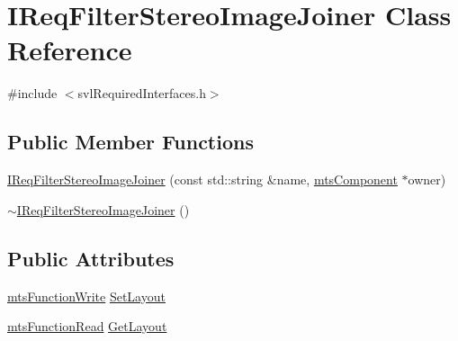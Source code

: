 \hypertarget{class_i_req_filter_stereo_image_joiner}{\section{I\-Req\-Filter\-Stereo\-Image\-Joiner Class Reference}
\label{class_i_req_filter_stereo_image_joiner}
}


{\ttfamily \#include $<$svl\-Required\-Interfaces.\-h$>$}

\subsection*{Public Member Functions}
\begin{DoxyCompactItemize}
\item 
\hyperlink{class_i_req_filter_stereo_image_joiner_a38b9f6681dd0448013184e714d353925}{I\-Req\-Filter\-Stereo\-Image\-Joiner} (const std\-::string \&name, \hyperlink{classmts_component}{mts\-Component} $\ast$owner)
\item 
\hyperlink{class_i_req_filter_stereo_image_joiner_a820977ea07d10846550aa1663f0e3115}{$\sim$\-I\-Req\-Filter\-Stereo\-Image\-Joiner} ()
\end{DoxyCompactItemize}
\subsection*{Public Attributes}
\begin{DoxyCompactItemize}
\item 
\hyperlink{classmts_function_write}{mts\-Function\-Write} \hyperlink{class_i_req_filter_stereo_image_joiner_a5e2f7bb1b492d0001721ae8dea1348b7}{Set\-Layout}
\item 
\hyperlink{classmts_function_read}{mts\-Function\-Read} \hyperlink{class_i_req_filter_stereo_image_joiner_a39c729d4120ae4e0cc05b58d9e478812}{Get\-Layout}
\end{DoxyCompactItemize}


